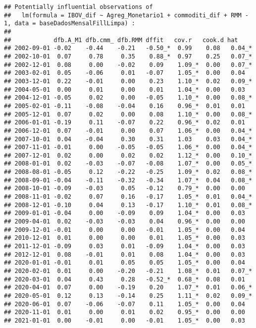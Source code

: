 \documentclass[
]{article}
\begin{document}
\begin{verbatim}
## Potentially influential observations of
##   lm(formula = IBOV_dif ~ Agreg_Monetario1 + commoditi_dif + RMM -      1, data = baseDadosMensalFillLimpa) :
## 
##            dfb.A_M1 dfb.cmm_ dfb.RMM dffit   cov.r   cook.d hat    
## 2002-09-01 -0.02    -0.44    -0.21   -0.50_*  0.99    0.08   0.04_*
## 2002-10-01  0.07     0.78     0.35    0.88_*  0.97    0.25   0.07_*
## 2002-12-01  0.08     0.00    -0.02    0.09    1.09_*  0.00   0.07_*
## 2003-02-01  0.05    -0.06     0.01   -0.07    1.05_*  0.00   0.04  
## 2003-12-01  0.22    -0.01     0.00    0.23    1.10_*  0.02   0.09_*
## 2004-05-01  0.00     0.01     0.00    0.01    1.04_*  0.00   0.03  
## 2004-12-01 -0.05     0.02     0.00   -0.05    1.10_*  0.00   0.08_*
## 2005-02-01 -0.11    -0.08    -0.04    0.16    0.96_*  0.01   0.01  
## 2005-12-01  0.07     0.02     0.00    0.08    1.10_*  0.00   0.08_*
## 2006-01-01 -0.19     0.11    -0.07    0.22    0.96_*  0.02   0.01  
## 2006-12-01  0.07    -0.01     0.00    0.07    1.06_*  0.00   0.04_*
## 2007-10-01  0.04    -0.04     0.30    0.31    1.03    0.03   0.04_*
## 2007-11-01 -0.01     0.00    -0.05   -0.05    1.06_*  0.00   0.04_*
## 2007-12-01  0.02     0.00     0.02    0.02    1.12_*  0.00   0.10_*
## 2008-01-01  0.02    -0.03    -0.07   -0.08    1.07_*  0.00   0.05_*
## 2008-08-01 -0.05     0.12    -0.22   -0.25    1.09_*  0.02   0.08_*
## 2008-09-01 -0.04    -0.11    -0.32   -0.34    1.07_*  0.04   0.08_*
## 2008-10-01 -0.09    -0.03     0.05   -0.12    0.79_*  0.00   0.00  
## 2008-11-01 -0.02     0.07     0.16   -0.17    1.05_*  0.01   0.04_*
## 2008-12-01 -0.10     0.04     0.13   -0.17    1.10_*  0.01   0.08_*
## 2009-01-01 -0.04     0.00    -0.09    0.09    1.04_*  0.00   0.03  
## 2009-04-01  0.02    -0.03    -0.03    0.04    0.96_*  0.00   0.00  
## 2009-12-01 -0.01     0.00     0.00   -0.01    1.05_*  0.00   0.04  
## 2010-12-01  0.01     0.00     0.00    0.01    1.05_*  0.00   0.03  
## 2011-12-01 -0.09     0.03     0.01   -0.09    1.04_*  0.00   0.03  
## 2012-12-01  0.08    -0.01     0.01    0.08    1.04_*  0.00   0.03  
## 2020-01-01 -0.01     0.01     0.05    0.05    1.05_*  0.00   0.04  
## 2020-02-01  0.01     0.00    -0.20   -0.21    1.08_*  0.01   0.07_*
## 2020-03-01  0.04     0.43     0.28   -0.52_*  0.68_*  0.08   0.01  
## 2020-04-01  0.07     0.00    -0.19    0.20    1.07_*  0.01   0.06_*
## 2020-05-01  0.12     0.13    -0.14    0.25    1.11_*  0.02   0.09_*
## 2020-06-01  0.07    -0.06    -0.07    0.11    1.05_*  0.00   0.04  
## 2020-11-01  0.01     0.00     0.01    0.02    0.95_*  0.00   0.00  
## 2021-01-01  0.00    -0.01     0.00   -0.01    1.05_*  0.00   0.03
\end{verbatim}
\end{document}

